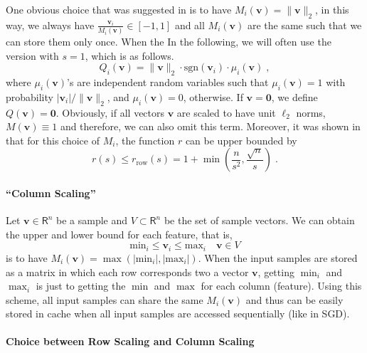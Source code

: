 \documentclass{article}
\newcommand{\R}{\mathsf{R}}
\newcommand{\sgn}[1]{\mbox{sgn}(#1)}
\renewcommand{\vec}[1]{\mathbf{#1}}
\def\rrow{r_\mathrm{row}}
\begin{document}
One obvious choice that was suggested in \cite{Alistarh:2016:ArXiv} is to have $M_i(\vec{v}) = \| \vec{v} \|_2$, in this way, we
always have $\frac{\vec{v}_i}{M_i(\vec{v})} \in [-1, 1]$ and all $M_i(\vec{v})$ are the same
such that we can store them only once.
When the 
In the following, we will often use the version with $s = 1$, which is as follows. 
\begin{equation}
\label{equ:quant1}
Q_i(\vec{v}) = \| \vec{v} \|_2 \cdot \sgn{\vec{v}_i} \cdot \mu_i (\vec{v}) \; ,
\end{equation}
where $\mu_i(\vec{v})$'s are independent random variables such that $\mu_i(\vec{v}) = 1$ with probability $|\vec{v}_i| / \| \vec{v} \|_2$, and $\mu_i(\vec{v}) = 0$, otherwise. If $\vec{v} = \vec{0}$, we define $Q(\vec{v}) = \vec{0}$. 
%
Obviously, if
all vectors $\vec{v}$ are scaled to have unit $\ell_2$ norms, $M(\vec{v}) \equiv 1$
and therefore, we can also omit this term.
Moreover, it was shown in \cite{Alistarh:2016:ArXiv} that for this choice of $M_i$, the function $r$ can be upper bounded by
\[
r(s) \leq \rrow (s) = 1 + \min\left( \frac{n}{s^2}, \frac{\sqrt{n}}{s} \right) \; .
\]

\paragraph*{``Column Scaling''}
Let $\vec{v} \in \R^n$ be a sample and $V \subset \R^n$ be the set of sample vectors. 
We can obtain the upper and lower bound for each feature, that is,
\[
\text{min}_i \le \vec{v}_i \le  \text{max}_i\quad \vec{v} \in V
\]
is to have $M_i(\vec{v}) = \max(|\text{min}_i|, |\text{max}_i|)$.
When the input samples are stored as a matrix in which each row corresponds
two a vector $\vec{v}$, getting $\min_i$ and $\max_i$
is just to getting
the $\min$ and $\max$ for each column (feature).
Using this scheme, all input samples can share the same
$M_i(\vec{v})$ and thus can be easily stored in cache when all
input samples are accessed sequentially (like in SGD).


\paragraph*{Choice between Row Scaling and Column Scaling}
\end{document}
